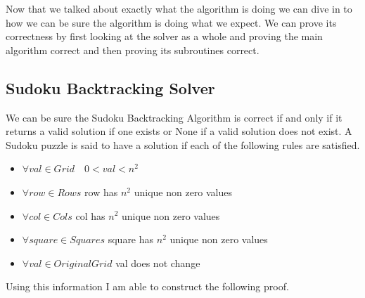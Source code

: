 \documentclass{sig-alternate}
\begin{document}
Now that we talked about exactly what the algorithm is doing we can dive in to how we can be sure the algorithm is doing what we expect. We can prove its correctness by first looking at the solver as a whole and proving the main algorithm correct and then proving its subroutines correct. 

\subsection{Sudoku Backtracking Solver}
We can be sure the Sudoku Backtracking Algorithm is correct if and only if it returns a valid solution if one exists or None if a valid solution does not exist. A Sudoku puzzle is said to have a solution if each of the following rules are satisfied. 
\begin{itemize}
\item{$\forall val \in Grid \quad 0 < val < n^2$} 
\item{$\forall row \in Rows$ row has $n^2$ unique non zero values}
\item{$\forall col \in Cols$ col has $n^2$ unique non zero values}
\item{$\forall square \in Squares$ square has $n^2$ unique non zero values}
\item{$\forall val \in Original Grid$ val does not change}
\end{itemize}

Using this information I am able to construct the following proof. 
\end{document}
